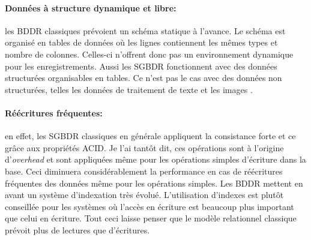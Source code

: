 \paragraph{Données à structure dynamique et libre:} les 
\textsf{BDDR} classiques prévoient un schéma statique à 
l'avance. Le schéma est organisé en tables de données où les lignes
contiennent les mêmes types et nombre de colonnes. Celles-ci n'offrent
donc pas un environnement dynamique pour les enregistrements. Aussi
les \textsf{SGBDR} fonctionnent avec des données structurées
organisables en tables.  Ce n'est pas le cas avec des données non
structurées, telles les données de traitement de texte et les images
\cite{NealLeavitt}.

\paragraph{Réécritures fréquentes:}  en effet, les \textsf{SGBDR} classiques en générale
appliquent la consistance forte et ce grâce aux propriétés \textsf{ACID}. 
Je l'ai tantôt dit, ces opérations sont à l'origine d'\textit{overhead} 
et sont appliquées même pour les opérations simples d'écriture dans la base. Ceci diminuera
considérablement la performance en cas de réécritures fréquentes des données même pour
les opérations simples.
Les \textsf{BDDR} mettent en avant un système d'indexation très évolué. L'utilisation
d'indexes est plutôt conseillée pour les systèmes où l'accès en écriture est
beaucoup plus important que celui en écriture. Tout ceci laisse penser que le modèle relationnel
classique prévoit plus de lectures que d'écritures. 

